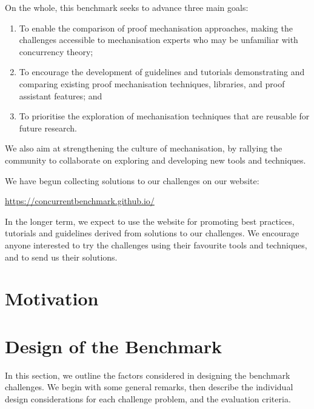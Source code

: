 \documentclass[runningheads]{llncs}
\begin{document}
On the whole, this benchmark seeks to advance three main goals:

\begin{enumerate}[label=\textbf{(G\arabic*)},leftmargin=10mm]
\item\label{item:goal-comperison-accessibility} To enable the comparison of
  proof mechanisation approaches, making the challenges accessible to
  mechanisation experts who may be unfamiliar with concurrency theory;

\item\label{item:goal-tutorials} To encourage the development of guidelines and
  tutorials demonstrating and comparing existing proof mechanisation
  techniques, libraries, and proof assistant features; and

\item\label{item:goal-reusability} To prioritise the exploration of mechanisation
  techniques that are reusable for future research.
\end{enumerate}
We also aim at strengthening the culture of mechanisation, by rallying the
community to collaborate on exploring and developing new tools and techniques.

We have begun collecting solutions to our challenges on our website:
%
\begin{center}
  \url{https://concurrentbenchmark.github.io/}
\end{center}
%
In the longer term, we expect to use the website for promoting best practices,
tutorials and guidelines derived from solutions to our challenges.
We encourage anyone interested to try the challenges using their
favourite tools and techniques, and to send us their solutions.

\section{Motivation}\label{sec:motivation}

\section{Design of the Benchmark}\label{sec:design-discussion}

In this section, we outline the factors considered in designing the
benchmark challenges. We begin with some general remarks, then
describe the individual design considerations for each challenge problem,
and the evaluation criteria.
\end{document}
